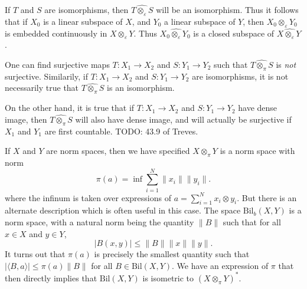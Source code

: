 If $T$ and $S$ are isomorphisms, then $T \widehat{\otimes_\varepsilon} S$ will be an isomorphism. Thus it follows that if $X_0$ is a linear subspace of $X$, and $Y_0$ a linear subspace of $Y$, then $X_0 \otimes_\varepsilon Y_0$ is embedded continuously in $X \otimes_\varepsilon Y$. Thus $X_0 \widehat{\otimes_\varepsilon} Y_0$ is a closed subspace of $X \widehat{\otimes_\varepsilon} Y$.

\begin{remark}
    One can find surjective maps $T: X_1 \to X_2$ and $S: Y_1 \to Y_2$ such that $T \widehat{\otimes_\pi} S$ is \emph{not} surjective. Similarily, if $T: X_1 \to X_2$ and $S: Y_1 \to Y_2$ are isomorphisms, it is not necessarily true that $T \widehat{\otimes_\pi} S$ is an isomorphism.
\end{remark}

On the other hand, it is true that if $T: X_1 \to X_2$ and $S: Y_1 \to Y_2$ have dense image, then $T \widehat{\otimes_\pi} S$ will also have dense image, and will actually be surjective if $X_1$ and $Y_1$ are first countable. TODO: 43.9 of Treves.

If $X$ and $Y$ are norm spaces, then we have specified $X \otimes_\pi Y$ is a norm space with norm
%
\[ \pi(a) = \inf \sum_{i = 1}^N \| x_i \| \| y_i \|. \]
%
where the infinum is taken over expressions of $a = \sum_{i = 1}^N x_i \otimes y_i$. But there is an alternate description which is often useful in this case. The space $\text{Bil}_b(X,Y)$ is a norm space, with a natural norm being the quantity $\| B \|$ such that for all $x \in X$ and $y \in Y$,
%
\[ |B(x,y)| \leq \| B \| \| x \| \| y \|. \]
%
It turns out that $\pi(a)$ is precisely the smallest quantity such that $|\langle B, a \rangle| \leq \pi(a) \| B \|$ for all $B \in \text{Bil}(X,Y)$. We have an expression of $\pi$ that then directly implies that $\text{Bil}(X,Y)$ is isometric to $(X \otimes_\pi Y)^*$.

